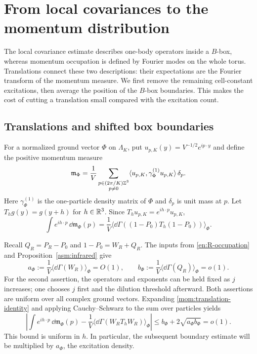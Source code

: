 \section{From local covariances to the momentum distribution}
\label{mom:section}\label{sec:momentum}

The local covariance estimate describes one-body operators inside a
$B$-box, whereas momentum occupation is defined by Fourier modes on the
whole torus. Translations connect these two descriptions: their
expectations are the Fourier transform of the momentum measure. We
first remove the remaining cell-constant excitations, then average the
position of the $B$-box boundaries. This makes the cost of cutting a
translation small compared with the excitation count.

\subsection{Translations and shifted box boundaries}

For a normalized ground vector $\Phi$ on $\Lambda_K$, put
$u_{p,K}(y)=V^{-1/2}e^{ip\cdot y}$ and define the positive momentum measure
\begin{equation}\label{mom:scaled-measure}
 \mathfrak m_\Phi
   =\frac1V\sum_{\substack{p\in(2\pi/K)\mathbb Z^3\\p\ne0}}
       \langle u_{p,K},\gamma^{(1)}_\Phi u_{p,K}\rangle\,\delta_p.
\end{equation}
Here $\gamma^{(1)}_\Phi$ is the one-particle density matrix of $\Phi$ and
$\delta_p$ is unit mass at $p$. Let $T_hg(y)=g(y+h)$ for $h\in\mathbb R^3$.
Since $T_hu_{p,K}=e^{ih\cdot p}u_{p,K}$,
\begin{equation}\label{mom:translation-identity}
 \int e^{ih\cdot p}\,\dd\mathfrak m_\Phi(p)
   =\frac1V\langle\dd\Gamma((1-P_0)T_h(1-P_0))\rangle_\Phi.
\end{equation}

Recall $Q_R=P_R-P_0$ and $1-P_0=W_R+Q_R$. The inputs from
\eqref{en:R-occupation} and Proposition~\ref{asm:infrared} give
\begin{equation}\label{mom:excitation-masses}
 a_\Phi:=\frac1V\langle\dd\Gamma(W_R)\rangle_\Phi=O(1),
 \qquad
 b_\Phi:=\frac1V\langle\dd\Gamma(Q_R)\rangle_\Phi=o(1).
\end{equation}
For the second assertion, the operators and exponents can be held fixed
as $j$ increases; one chooses $j$ first and the dilution threshold
afterward. Both assertions are uniform over all complex ground vectors.
Expanding \eqref{mom:translation-identity} and applying Cauchy--Schwarz
to the sum over particles yields
\begin{equation}\label{mom:remove-coarse}
 \left|\int e^{ih\cdot p}\,\dd\mathfrak m_\Phi(p)
       -\frac1V\langle\dd\Gamma(W_RT_hW_R)\rangle_\Phi\right|
       \le b_\Phi+2\sqrt{a_\Phi b_\Phi}=o(1).
\end{equation}
This bound is uniform in $h$. In particular, the subsequent boundary
estimate will be multiplied by $a_\Phi$, the excitation density.

